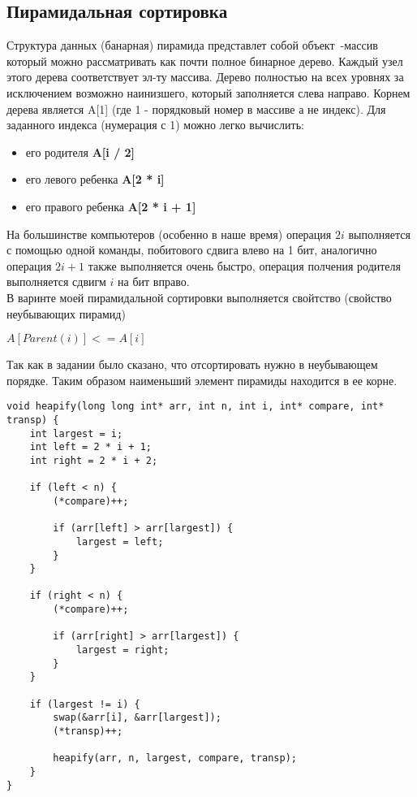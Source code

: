 \documentclass[a4paper,12pt,titlepage,finall]{article}
\begin{document}
\newpage

\subsection{Пирамидальная сортировка}

Структура данных (банарная) пирамида представлет
собой объект~-массив который можно рассматривать как почти полное бинарное дерево.
Каждый узел этого дерева соответствует эл-ту массива. Дерево полностью на всех уровнях 
за исключением возможно наинизшего, который заполняется слева направо.
Корнем дерева является A[1] (где 1 - порядковый номер в массиве а не индекс). Для заданного 
индекса (нумерация с 1) можно легко вычислить:
\begin{itemize}
    \item его родителя \textbf{A[i / 2]}
    \item его левого ребенка \textbf{A[2 * i]}
    \item его правого ребенка \textbf{A[2 * i + 1]}
\end{itemize}

На большинстве компьютеров (особенно в наше время) операция $2i$ выполняется с помощью одной
команды, побитового сдвига влево на 1 бит, аналогично 
операция $2i + 1$ также выполняется очень быстро, операция полчения родителя выполняется
сдвигм $i$ на бит вправо.\\
В варинте моей пирамидальной сортировки выполняется свойтство (свойство неубывающих пирамид) \\
\begin{center}
    $A[Parent(i)] <= A[i]$
\end{center}

Так как в задании было сказано, что отсортировать нужно в неубывающем порядке.
Таким образом наименьший элемент пирамиды находится в ее корне.

\begin{verbatim}
void heapify(long long int* arr, int n, int i, int* compare, int* transp) {
    int largest = i;
    int left = 2 * i + 1;
    int right = 2 * i + 2;

    if (left < n) {
        (*compare)++;

        if (arr[left] > arr[largest]) {
            largest = left;
        }
    }

    if (right < n) {
        (*compare)++;

        if (arr[right] > arr[largest]) {
            largest = right;
        }
    }

    if (largest != i) {
        swap(&arr[i], &arr[largest]);
        (*transp)++;

        heapify(arr, n, largest, compare, transp);
    }
}    
\end{verbatim}
\end{document}

